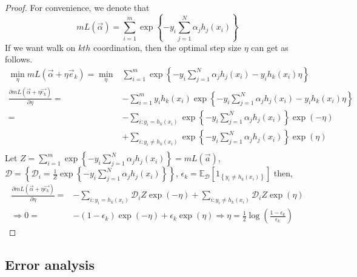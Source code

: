 \begin{proof}
    For convenience, we denote that
    \[
        mL( \vec{\alpha} ) = \sum^{m}_{i=1} \exp \left\{ - y_i \sum^{N}_{j=1} \alpha_j h_j(x_i) \right\}
    \]
    If we want walk on $ k th $ coordination, then the optimal step size $ \eta $ can get as follows.
    \begin{align*}
        \min_{\eta} mL( \vec{\alpha} + \eta \vec{e}_k)
        =\min_\eta & \sum^{m}_{i=1} \exp \left\{ - y_i \sum^{N}_{j=1} \alpha_j h_j(x_i) - y_i h_k(x_i)\eta \right\} \\
        \frac{\partial{mL( \vec{\alpha} + \eta \vec{e_k} )}}{\partial{\eta}} 
        =& -\sum^{m}_{i=1} y_i h_k(x_i)\exp \left\{ - y_i \sum^{N}_{j=1} \alpha_j h_j(x_i) - y_i h_k(x_i)\eta \right\} \\
        =& -\sum^{}_{i: y_i = h_k(x_i)} \exp \left\{ - y_i \sum^{N}_{j=1} \alpha_j h_j(x_i) \right\} \exp (- \eta )\\
         & +\sum^{}_{i: y_i \ne h_k(x_i)} \exp \left\{ - y_i \sum^{N}_{j=1} \alpha_j h_j(x_i) \right\} \exp (\eta) \\
    \end{align*}
    Let $ Z = \sum^{m}_{i=1} \exp \left\{ - y_i \sum^{N}_{j=1} \alpha_j h_j(x_i) \right\} = mL( \vec{a} )$,
    $ \mathcal{D} = \left\{ \mathcal{D}_i =  \frac{1}{Z} \exp \left\{ - y_i \sum^{N}_{j=1} \alpha_j h_j(x_i) \right\} \right\} $,
    $ \epsilon_k = \mathbb{E}_{ \mathcal{D}}[ 1_{\left\{ y_i \ne h_k(x_i) \right\}}] $ 
    then,
    \begin{align*}
        \frac{\partial{mL( \vec{\alpha} + \eta \vec{e_k} )}}{\partial{\eta}} 
        =& -\sum^{}_{i: y_i = h_k(x_i)} \mathcal{D}_i Z\exp (- \eta )
          +\sum^{}_{i: y_i \ne h_k(x_i)} \mathcal{D}_i Z\exp (\eta) \\
        \Rightarrow 0 =& -(1 - \epsilon_k) \exp(-\eta) + \epsilon_k \exp(\eta)
        \Rightarrow \eta = \frac{1}{2} \log \left(\frac{1 - \epsilon_k}{\epsilon_k} \right)
    \end{align*}
\end{proof}

\subsection{Error analysis}%
\label{sub:error_analysis}

